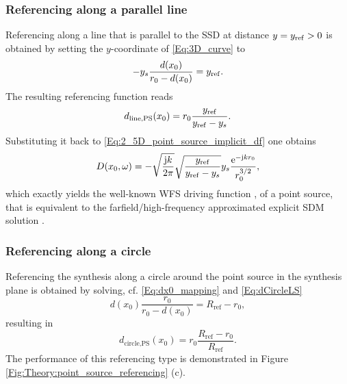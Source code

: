 \subsubsection{Referencing along a parallel line}
Referencing along a line that is parallel to the SSD at distance $y=y_{\mathrm{ref}}>0$ is obtained by setting the $y$-coordinate of \eqref{Eq:3D_curve} to
\begin{equation}
-y_s \frac{d(x_0)}{r_0 - d(x_0)} = y_{\mathrm{ref}}.
\end{equation}
The resulting referencing function reads
\begin{equation}
d_\text{line,PS}(x_0) = r_0 \frac{y_{\mathrm{ref}}}{y_{\mathrm{ref}}-y_s}.
\end{equation}
Substituting it back to \eqref{Eq:2_5D_point_source_implicit_df} one obtains
\begin{equation}
D(x_0,\omega) = 
- \sqrt{\frac{\mathrm{j} k}{2\pi}} \sqrt{\frac{y_{\mathrm{ref}}}{y_{\mathrm{ref}} -y_s}}  y_s \frac{\mathrm{e}^{-\mathrm{j} k r_0 }}{r_0^{3/2}},
\end{equation}
which exactly yields the well-known WFS driving function \cite[(2.27)]{Verheijen1997}, \cite[(3.16)\&(3.17)]{Start1997:phd} of a point source, that is equivalent to the farfield/high-frequency approximated explicit SDM solution \cite[(25)]{Spors10ahrens:analysis}.

\subsubsection{Referencing along a circle}
Referencing the synthesis along a circle around the point source in the synthesis plane is obtained by solving, cf. \eqref{Eq:dx0_mapping} and \eqref{Eq:dCircleLS}
\begin{equation}
d(x_0)\frac{r_0}{r_0 - d(x_0)} = R_{\mathrm{ref}} - r_0,
\end{equation}
resulting in
\begin{equation}
d_\text{circle,PS}(x_0)  = r_0 \frac{R_{\mathrm{ref}} - r_0}{R_{\mathrm{ref}}}.
\end{equation}
%
The performance of this referencing type is demonstrated in Figure \ref{Fig:Theory:point_source_referencing} (c).


%
